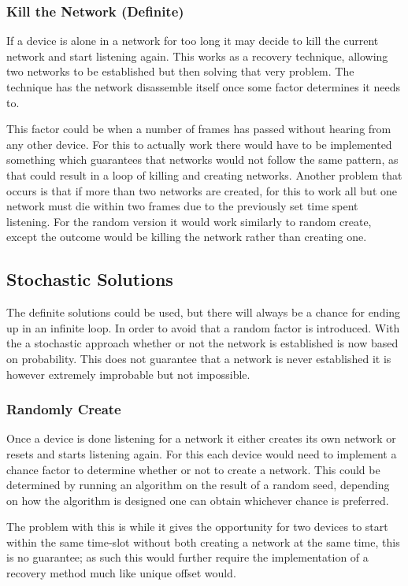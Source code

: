 \subsubsection{Kill the Network (Definite)}\label{KtN}
If a device is alone in a network for too long it may decide to kill the current network and start listening again.
This works as a recovery technique, allowing two networks to be established but then solving that very problem.
The technique has the network disassemble itself once some factor determines it needs to.

This factor could be when a number of frames has passed without hearing from any other device.
For this to actually work there would have to be implemented something which guarantees that networks would not follow the same pattern, as that could result in a loop of killing and creating networks.
Another problem that occurs is that if more than two networks are created, for this to work all but one network must die within two frames due to the previously set time spent listening.
For the random version it would work similarly to random create, except the outcome would be killing the network rather than creating one.

\subsection{Stochastic Solutions}
The definite solutions could be used, but there will always be a chance for ending up in an infinite loop.
In order to avoid that a random factor is introduced.
With the a stochastic approach whether or not the network is established is now based on probability.
This does not guarantee that a network is never established it is however extremely improbable but not impossible.

\subsubsection{Randomly Create}\label{RCreate}
Once a device is done listening for a network it either creates its own network or resets and starts listening again.
For this each device would need to implement a chance factor to determine whether or not to create a network.
This could be determined by running an algorithm on the result of a random seed, depending on how the algorithm is designed one can obtain whichever chance is preferred.

The problem with this is while it gives the opportunity for two devices to start within the same time-slot without both creating a network at the same time, this is no guarantee; as such this would further require the implementation of a recovery method much like unique offset would.

